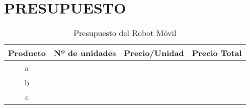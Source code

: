 \chapter{PRESUPUESTO}

\begin{center}
\begin{table}[h!]
  \begin{tabular}{|c|c|c|c|}
  \hline
  Producto & Nº de unidades & Precio/Unidad & Precio Total \\ \hline
  \hline
  a & & & \\ \hline
  b & & & \\ \hline
  c & & & \\ \hline
  \end{tabular}
  \caption{Presupuesto del Robot Móvil}
  \label{Presupuesto}

\end{table}
\end{center}
